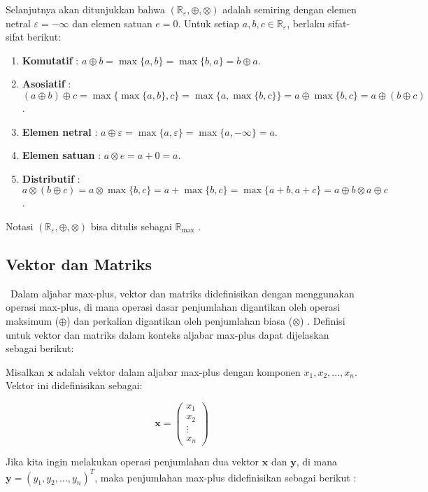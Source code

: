 \documentclass[12pt]{article}
\numberwithin{lemma}{subsection}
\newcommand{\R}{\mathbb{R}}
\begin{document}
Selanjutnya akan ditunjukkan bahwa $\left(\R_\varepsilon,\oplus,\otimes\right)$ adalah semiring dengan elemen netral $\varepsilon=-\infty$ dan elemen satuan $e=0$. Untuk setiap $a,b,c\in\R_\varepsilon$, berlaku sifat-sifat berikut:
\begin{enumerate}
	\item \textbf{Komutatif} : $a\oplus b=\max\{a,b\}=\max\{b,a\}=b\oplus a$.
	\item \textbf{Asosiatif} : $(a\oplus b)\oplus c=\max\{\max\{a,b\},c\}=\max\{a,\max\{b,c\}\}=a\oplus\max\{b,c\}=a\oplus(b\oplus c)$.
	\item \textbf{Elemen netral} : $a\oplus\varepsilon=\max\{a,\varepsilon\}=\max\{a,-\infty\}=a$.
	\item \textbf{Elemen satuan} : $a\otimes e=a+0=a$.
	\item \textbf{Distributif} : $a\otimes(b\oplus c)=a\otimes\max\{b,c\}=a+\max\{b,c\}=\max\{a+b,a+c\}=a\oplus b\otimes a\oplus c$.
\end{enumerate}
Notasi $\left(\R_\varepsilon,\oplus,\otimes\right)$ bisa ditulis sebagai $\R_{\max}$ \citep{subiono2015minmaxplus}.

\subsection{Vektor dan Matriks}

$\,$\hskip 1cm Dalam aljabar max-plus, vektor dan matriks didefinisikan dengan menggunakan operasi max-plus, di mana operasi dasar penjumlahan digantikan oleh operasi maksimum (\(\oplus\)) dan perkalian digantikan oleh penjumlahan biasa (\(\otimes\)) \citep{butkovic2010maxplus,heidergott,baccelli}. Definisi untuk vektor dan matriks dalam konteks aljabar max-plus dapat dijelaskan sebagai berikut:

Misalkan \( \mathbf{x} \) adalah vektor dalam aljabar max-plus dengan komponen \( x_1, x_2, \dots, x_n \). Vektor ini didefinisikan sebagai:

\[
\mathbf{x} = \begin{pmatrix} x_1 \\ x_2 \\ \vdots \\ x_n \end{pmatrix}
\]

Jika kita ingin melakukan operasi penjumlahan dua vektor \( \mathbf{x} \) dan \( \mathbf{y} \), di mana \( \mathbf{y} = (y_1, y_2, \dots, y_n)^T \), maka penjumlahan max-plus didefinisikan sebagai berikut \citep{cassandras}:
\end{document}
